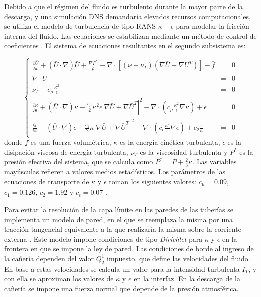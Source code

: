 Debido a que el régimen del fluido es turbulento durante la mayor parte de la descarga,
y una simulación DNS demandaría elevados recursos computacionales,
se utiliza el modelo de turbulencia de tipo RANS $\kappa-\epsilon$ para modelar la fricción interna del fluido.
Las ecuaciones se estabilizan mediante un método de control de coeficientes \cite{k-e-realizable}.
El sistema de ecuaciones resultantes en el segundo subsistema es:

\begin{equation}
\left\{ \begin{array}{rcl}
\displaystyle \frac{\partial \bar{U} }{\partial t} + ( \bar{U} \cdot \nabla) \bar{U} + \frac {\nabla P^*}{\rho} - 
\nabla \cdot \left[ \left( \nu + \nu_T \right) \left( \nabla \bar{U} + \nabla U^T \right) \right] -\bar{f} &=& 0 \\
\nabla \cdot \bar{U} &=& 0 \\
\displaystyle \nu_T -c_\mu \frac{\kappa^2}{\epsilon} &=& 0\\
\displaystyle \frac{\partial \kappa}{\partial t} + ( \bar{U} \cdot \nabla) \kappa - \frac{c_\mu} {2}{\kappa^2}{\epsilon} \left | \nabla \bar{U} + \nabla\bar{U}^T \right | ^2  
- \nabla \cdot \left( c_\mu \frac{\kappa^2}{\epsilon} \nabla \kappa \right) + \epsilon &=& 0 \\
\displaystyle \frac{\partial {\epsilon}}{\partial t} + ( \bar{U} \cdot \nabla) \epsilon - \frac{c_1} {2} \kappa \left | \nabla \bar{U} + \nabla \bar{U}^T \right | ^2
- \nabla \cdot \left( c_{\epsilon} \frac{\kappa^2}{\epsilon} \nabla \epsilon \right) + c_2 \frac{\epsilon}{\kappa} &=& 0
\label{eq-mani}
\end{array} \right.
\end{equation}
donde $\bar{f}$ es una fuerza volumétrica, 
$\kappa$ es la energía cinética turbulenta, $\epsilon$ es la disipación viscosa de energía turbulenta,
$\nu_T$ es la viscosidad turbulenta y $P^*$ es la presión efectiva del sistema, que se calcula como
$\displaystyle P^* = P + \frac {2}{3}\kappa$.
Las variables mayúsculas refieren a valores medios estadísticos.
Los parámetros de las ecuaciones de transporte de $\kappa$ y $\epsilon$ toman los siguientes valores:
$c_\mu=0.09$, $c_1=0.126$, $c_2=1.92$ y $c_\epsilon=0.07$ \cite{durbin}.

Para evitar la resolución de la capa límite en las paredes de las tuberías se implementa un modelo de pared,
en el que se reemplaza la misma por una tracción tangencial equivalente a la que realizaría la misma sobre la corriente externa
\cite{k-e}.
Este modelo impone condiciones de tipo \textit{Dirichlet} para $\kappa$ y $\epsilon$ en la frontera en que se impone la ley de pared.
Las condiciones de borde al ingreso de la cañería dependen del valor $Q_2^1$ impuesto,
que define las velocidades del fluido.
En base a estas velocidades se calcula un valor para la intensidad turbulenta $I_T$,
y con ella se aproximan los valores de $\kappa$ y $\epsilon$ en la interfaz.
En la descarga de la cañería se impone una fuerza normal que depende de la presión atmosférica.

